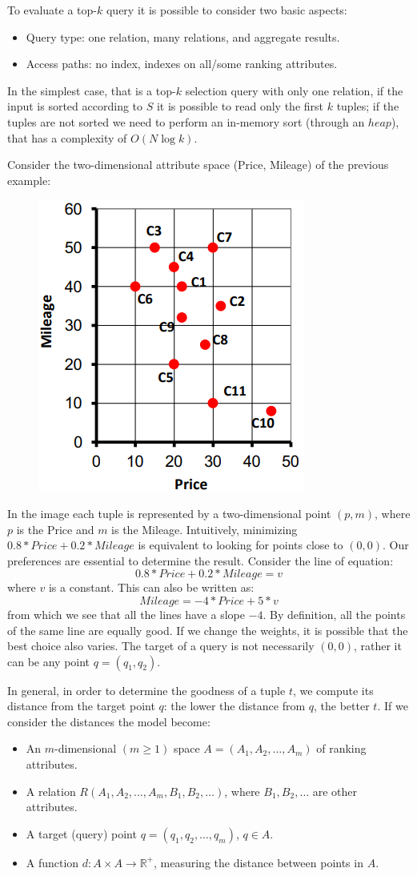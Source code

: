 \documentclass[12pt, a4paper]{report}
\newtheorem[style=M,bodystyle=\normalfont]{theorem}{Theorem}
\newtheorem[style=M,bodystyle=\normalfont]{corollary}{Corollary}
\newtheorem[style=M,bodystyle=\normalfont]{lemma}{Lemma}
\newtheorem[style=M,bodystyle=\normalfont]{definition}{Definition}
\begin{document}
    To evaluate a top-$k$ query it is possible to consider two basic aspects: 
    \begin{itemize}
        \item Query type: one relation, many relations, and aggregate results. 
        \item Access paths: no index, indexes on all/some ranking attributes. 
    \end{itemize}
    In the simplest case, that is a top-$k$ selection query with only one relation, if the input is sorted according to $S$ it is possible to read only the first $k$ tuples; 
    if the tuples are not sorted we need to perform an in-memory sort (through an $heap$), that has a complexity of $O(N\log{k})$. 
    \begin{example}
        Consider the two-dimensional attribute space (Price, Mileage) of the previous example: 
        \begin{figure}[H]
            \centering
            \includegraphics[width=0.25\linewidth]{images/ex1.png}
        \end{figure}
        In the image each tuple is represented by a two-dimensional point $(p, m)$, where $p$ is the Price and $m$ is the Mileage. Intuitively, minimizing
        $0.8*Price + 0.2*Mileage$ is equivalent to looking for points close to $(0,0)$. Our preferences are essential to determine the result. Consider the line of equation: 
        \[0.8*Price + 0.2*Mileage = v\]
        where $v$ is a constant. This can also be written as:
        \[Mileage = -4*Price + 5*v\]
        from which we see that all the lines have a slope $-4$. By definition, all the points of the same line are equally good. If we change the weights, it is possible 
        that the best choice also varies. 
        The target of a query is not necessarily $(0,0)$, rather it can be any point $q=(q_1,q_2)$. 
    \end{example}
    In general, in order to determine the goodness of a tuple $t$, we compute its distance from the target point $q$: the lower the distance from $q$, the better $t$. 
    If we consider the distances the model become: 
    \begin{itemize}
        \item An $m$-dimensional $(m \geq 1)$ space $A = (A_1,A_2,\dots,A_m)$ of ranking attributes. 
        \item A relation $R(A_1,A_2,\dots,A_m,B_1,B_2,\dots)$, where $B_1,B_2,\dots$ are other attributes.
        \item A target (query) point $q = (q_1,q_2,\dots,q_m)$, $q \in A$. 
        \item A function $d: A \times A \rightarrow \mathbb{R}^{+}$, measuring the distance between points in $A$. 
    \end{itemize}
\end{document}

